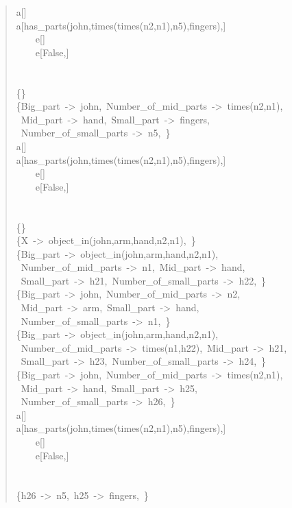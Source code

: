 \begin{quote}
a[]\\
a[has\_parts(john,times(times(n2,n1),n5),fingers),]\\
~~~~e[]\\
~~~~e[False,]\\
~\\
~\\
\{\}\\
\{Big\_part~->~john,~Number\_of\_mid\_parts~->~times(n2,n1),\\ ~Mid\_part~->~hand,~Small\_part~->~fingers,\\~Number\_of\_small\_parts~->~n5,~\}\\
a[]\\
a[has\_parts(john,times(times(n2,n1),n5),fingers),]\\
~~~~e[]\\
~~~~e[False,]\\
~\\
~\\
\{\}\\
\{X~->~object\_in(john,arm,hand,n2,n1),~\}\\
\{Big\_part~->~object\_in(john,arm,hand,n2,n1),\\ ~Number\_of\_mid\_parts~->~n1,~Mid\_part~->~hand,\\~Small\_part~->~h21,~Number\_of\_small\_parts~->~h22,~\}\\
\{Big\_part~->~john,~Number\_of\_mid\_parts~->~n2,\\ ~Mid\_part~->~arm,~Small\_part~->~hand,\\~Number\_of\_small\_parts~->~n1,~\}\\
\{Big\_part~->~object\_in(john,arm,hand,n2,n1),\\ ~Number\_of\_mid\_parts~->~times(n1,h22),~Mid\_part~->~h21,\\~Small\_part~->~h23,~Number\_of\_small\_parts~->~h24,~\}\\
\{Big\_part~->~john,~Number\_of\_mid\_parts~->~times(n2,n1),\\ ~Mid\_part~->~hand,~Small\_part~->~h25,\\~Number\_of\_small\_parts~->~h26,~\}\\
a[]\\
a[has\_parts(john,times(times(n2,n1),n5),fingers),]\\
~~~~e[]\\
~~~~e[False,]\\
~\\
~\\
\{h26~->~n5,~h25~->~fingers,~\}\\

\end{quote}
